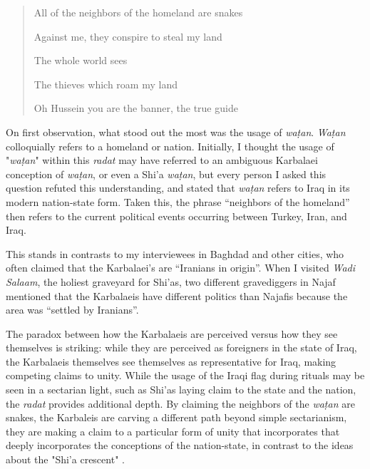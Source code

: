 






\begin{quote}
All of the neighbors of the homeland are snakes

Against me, they conspire to steal my land

The whole world sees

The thieves which roam my land

Oh Hussein you are the banner, the true guide
\end{quote}

On first observation, what stood out the most was the usage of \emph{waṭan}. \emph{Waṭan} colloquially refers to a homeland or nation. Initially, I thought the usage of "\emph{waṭan}" within this \emph{radat} may have referred to an ambiguous Karbalaei conception of \emph{waṭan}, or even a Shi'a \emph{waṭan}, but every person I asked this question refuted this understanding, and stated that \emph{waṭan} refers to Iraq in its modern nation-state form. Taken this, the phrase “neighbors of the homeland” then refers to the current political events occurring between Turkey, Iran, and Iraq. 

This stands in contrasts to my interviewees in Baghdad and other cities, who often claimed that the Karbalaei’s are “Iranians in origin”. When I visited \emph{Wadi Salaam}, the holiest graveyard for Shi'as, two different gravediggers in Najaf mentioned that the Karbalaeis have different politics than Najafis because the area was “settled by Iranians”. 

The paradox between how the Karbalaeis are perceived versus how they see themselves is striking: while they are perceived as foreigners in the state of Iraq, the Karbalaeis themselves see themselves as representative for Iraq, making competing claims to unity. While the usage of the Iraqi flag during rituals may be seen in a sectarian light, such as Shi'as laying claim to the state and the nation, the \emph{radat} provides additional depth. By claiming the neighbors of the \emph{waṭan} are snakes, the Karbaleis are carving a different path beyond simple sectarianism, they are making a claim to a particular form of unity that incorporates that deeply incorporates the conceptions of the nation-state, in contrast to the ideas about the "Shi'a crescent" \cite[120]{haddad_understanding_2020}. 

